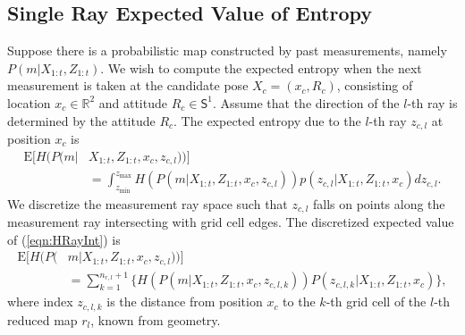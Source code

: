 \documentclass[smallextended]{svjour3}       %
\newcommand{\refeqn}[1]{(\ref{eqn:#1})}
\renewcommand{\Re}{\ensuremath{\mathbb{R}}}
\newcommand{\Sph}{\ensuremath{\mathsf{S}}}
\begin{document}
\subsection{Single Ray Expected Value of Entropy}
Suppose there is a probabilistic map constructed by past measurements, namely \\$P(m|X_{1:t},Z_{1:t})$. We wish to compute the expected entropy when the next measurement is taken at the candidate pose $X_c=(x_c,R_c)$, consisting of location $x_c\in\Re^2$ and attitude $R_c\in\Sph^1$. Assume that the direction of the $l$-th ray is determined by the attitude $R_c$.
The expected entropy due to the $l$-th ray $z_{c,l}$ at position $x_c$ is
\begin{align}
\label{eqn:HRayInt}
\text{E}[H(P(m|&X_{1:t},Z_{1:t},x_c,z_{c,l}))]
\nonumber\\&
=\int_{z_\text{min}}^{z_\text{max}}
H(P(m|X_{1:t},Z_{1:t},x_c,z_{c,l}))%
p(z_{c,l}|X_{1:t},Z_{1:t},x_c)
dz_{c,l}.
\end{align}
We discretize the measurement ray space such that $z_{c,l}$ falls on points along the measurement ray intersecting with grid cell edges. %
The discretized expected value of \refeqn{HRayInt} is
\begin{align}
\label{eqn:DiscExpEntropyRay}
\text{E}[H(P(&m|X_{1:t},Z_{1:t},x_c,z_{c,l}))]
\nonumber\\&=\sum_{k=1}^{n_{r,l}+1}\bigg\{H(P(m|X_{1:t},Z_{1:t},x_c,z_{c,l,k}))%
P(z_{c,l,k}|X_{1:t},Z_{1:t},x_c)\bigg\},
\end{align}
where index $z_{c,l,k}$ is the distance from position $x_c$ to the $k$-th grid cell of the $l$-th reduced map $r_l$, known from geometry.
\end{document}
